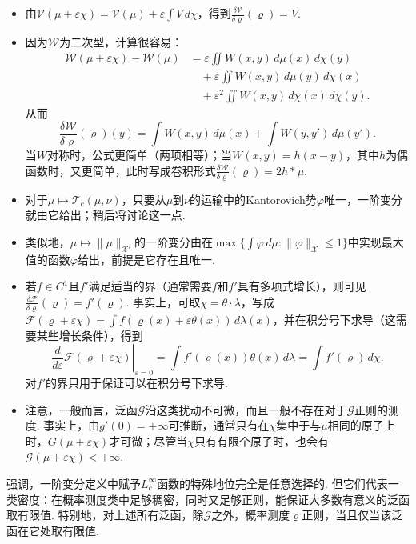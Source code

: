 \begin{itemize}
 \item 由$\mathscr V(\mu+\varepsilon\chi)=\mathscr V(\mu)+\varepsilon\int V\,d\chi$，得到$\frac{\delta\mathscr V}{\delta\varrho}(\varrho)=V$.
 \item 因为$\mathscr W$为二次型，计算很容易：
 \[
 \begin{aligned}
 \mathscr W(\mu+\varepsilon\chi)-\mathscr W(\mu)
 &=\varepsilon\iint W(x,y)\,d\mu(x)\,d\chi(y)\\
 &\quad+\varepsilon\iint W(x,y)\,d\mu(y)\,d\chi(x)\\
 &\quad+\varepsilon^2\iint W(x,y)\,d\chi(x)\,d\chi(y).
 \end{aligned}
 \]
 从而
 \[
 \frac{\delta\mathscr W}{\delta\varrho}(\varrho)(y)
       =\int W(x,y)\,d\mu(x)+\int W(y,y')\,d\mu(y').
 \]
 当$W$对称时，公式更简单（两项相等）；当$W(x,y)=h(x-y)$，其中$h$为偶函数时，又更简单，此时写成卷积形式$\frac{\delta\mathscr W}{\delta\varrho}(\varrho)=2h*\mu$.
 \item 对于$\mu\mapsto\mathscr T_c(\mu,\nu)$，只要从$\mu$到$\nu$的运输中的Kantorovich势$\varphi$唯一，一阶变分就由它给出；稍后将讨论这一点.
 \item 类似地，$\mu\mapsto\|\mu\|_{\mathscr X'}$的一阶变分由在$\max\{\int\varphi\,d\mu:\|\varphi\|_{\mathscr X}\leq1\}$中实现最大值的函数$\varphi$给出，前提是它存在且唯一.
 \item 若$f\in C^1$且$f'$满足适当的界（通常需要$f$和$f'$具有多项式增长），则可见$\frac{\delta\mathscr F}{\delta\varrho}(\varrho)=f'(\varrho)$. 事实上，可取$\chi=\theta\cdot\lambda$，写成$\mathscr F(\varrho+\varepsilon\chi)=\int f(\varrho(x)+\varepsilon\theta(x))\,d\lambda(x)$，并在积分号下求导（这需要某些增长条件），得到
 \[
 \left.\frac d{d\varepsilon}\mathscr F(\varrho+\varepsilon\chi)\right|_{\varepsilon=0}
 =\int f'(\varrho(x))\theta(x)\,d\lambda=\int f'(\varrho)\,d\chi.
 \]
 对$f'$的界只用于保证可以在积分号下求导.
 \item 注意，一般而言，泛函$\mathscr G$沿这类扰动不可微，而且一般不存在对于$\mathscr G$正则的测度. 事实上，由$g'(0)=+\infty$可推断，通常只有在$\chi$集中于与$\mu$相同的原子上时，$G(\mu+\varepsilon\chi)$才可微；尽管当$\chi$只有有限个原子时，也会有$\mathscr G(\mu+\varepsilon\chi)<+\infty$.
\end{itemize}
\begin{remark}\label{obj:7.14}
强调，一阶变分定义中赋予$L_c^\infty$函数的特殊地位完全是任意选择的. 但它们代表一类密度：在概率测度类中足够稠密，同时又足够正则，能保证大多数有意义的泛函取有限值. 特别地，对上述所有泛函，除$\mathscr G$之外，概率测度$\varrho$正则，当且仅当该泛函在它处取有限值.
\end{remark}

